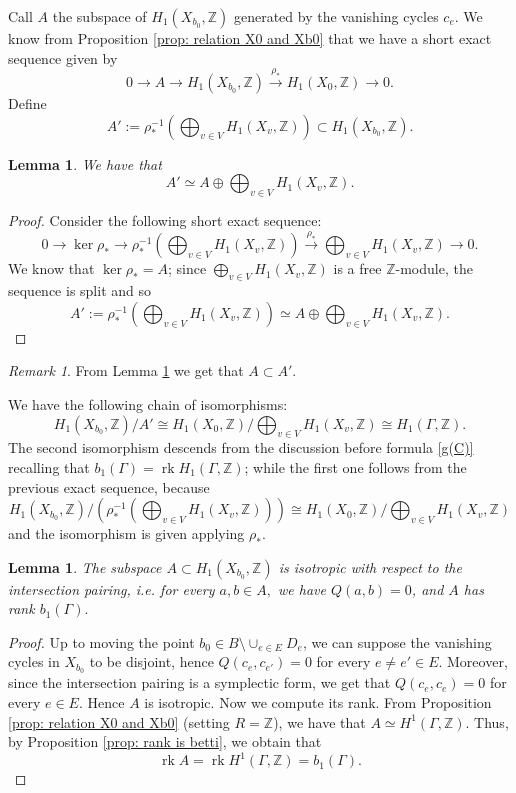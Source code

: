 \documentclass[a4paper,12 pt,titlepage,twoside]{book}
\newcommand{\numberset}{\mathbb}
\newcommand{\Z}{\numberset{Z}}
\DeclareMathOperator{\rk}{rk}
\theoremstyle{plain}
\theoremstyle{theorem}
\newtheorem{lemma}[thm]{Lemma}
\theoremstyle{definition}
\theoremstyle{remark}
\newtheorem{oss}[thm]{Remark}
\begin{document}
	Call $A$ the subspace of $H_1(X_{b_0},\Z)$ generated by the vanishing cycles $c_e$. We know from Proposition \ref{prop: relation X0 and Xb0} that we have a short exact sequence given by $$0 \rightarrow A \rightarrow H_1(X_{b_0},\Z) \stackrel{\rho_*}{\longrightarrow} H_1(X_0,\Z) \rightarrow 0.$$ Define $$A' := \rho_*^{-1}\left( \bigoplus_{v \in V} H_1(X_v,\Z)\right) \subset H_1(X_{b_0},\Z).$$ 
	\begin{lemma}\label{lem: A' is A plus the normalization homology}
		We have that $$A' \simeq A \oplus \bigoplus_{v \in V} H_1(X_v,\Z).$$
	\end{lemma}
	\begin{proof}
		Consider the following short exact sequence: $$0 \rightarrow \ker \rho_* \rightarrow \rho_*^{-1}\left( \bigoplus_{v \in V} H_1(X_v,\Z)\right) \stackrel{\rho_*}{\longrightarrow}  \bigoplus_{v \in V} H_1(X_v,\Z) \rightarrow 0.$$ We know that $\ker \rho_* = A$; since $\bigoplus_{v \in V} H_1(X_v,\Z)$ is a free $\Z$-module, the sequence is split and so $$A' := \rho_*^{-1}\left( \bigoplus_{v \in V} H_1(X_v,\Z)\right) \simeq A \oplus \bigoplus_{v \in V} H_1(X_v,\Z).$$ 
	\end{proof}
	\begin{oss}
		From Lemma \ref{lem: A' is A plus the normalization homology} we get that $A \subset A'.$
	\end{oss}
	We have the following chain of isomorphisms: $$H_1(X_{b_0},\Z)/A' \cong H_1(X_0,\Z)/ \bigoplus_{v \in V} H_1(X_v,\Z) \cong H_1(\Gamma,\Z).$$ The second isomorphism descends from the discussion before formula \ref{g(C)} recalling that $b_1(\Gamma)= \rk H_1(\Gamma,\Z)$; while the first one follows from the previous exact sequence, because $$H_1(X_{b_0},\Z)/\left(\rho_*^{-1}( \bigoplus_{v \in V} H_1(X_v,\Z))\right) \cong H_1(X_0,\Z) / \bigoplus_{v \in V} H_1(X_v,\Z)$$ and the isomorphism is given applying $\rho_*$.
	\begin{lemma}
		The subspace $A \subset H_1(X_{b_0},\Z)$ is isotropic with respect to the intersection pairing, i.e. for every $a,b \in A,$ we have $Q(a,b)=0$, and $A$ has rank $b_1(\Gamma).$
	\end{lemma}
	\begin{proof}
		Up to moving the point $b_0 \in B \setminus \cup_{e \in E} D_e$, we can suppose the vanishing cycles in $X_{b_0}$ to be disjoint, hence $Q(c_e,c_{e'})=0$ for every $e\neq e' \in E.$ Moreover, since the intersection pairing is a symplectic form, we get that $Q( c_e,c_e) =0$ for every $e \in E.$ Hence $A$ is isotropic. Now we compute its rank. From Proposition \ref{prop: relation X0 and Xb0} (setting $R=\Z$), we have that $A \simeq H^1(\Gamma,\Z)$. Thus, by Proposition \ref{prop: rank is betti}, we obtain that$$\rk A = \rk H^1(\Gamma,\Z) = b_1(\Gamma).$$
	\end{proof}
\end{document}
